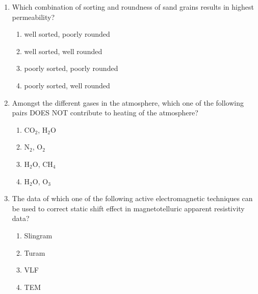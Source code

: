 \documentclass[journal,12pt,onecolumn]{IEEEtran}
\theoremstyle{remark}
\begin{document}
\begin{enumerate}
\item Which combination of sorting and roundness of sand grains results in highest permeability?  
\begin{enumerate}
\item well sorted, poorly rounded  
\item well sorted, well rounded  
\item poorly sorted, poorly rounded  
\item poorly sorted, well rounded  
\end{enumerate}

\item Amongst the different gases in the atmosphere, which one of the following pairs DOES NOT contribute to heating of the atmosphere?  
\begin{multicols}{4}
\begin{enumerate}
\item CO\(_2\), H\(_2\)O  
\item N\(_2\), O\(_2\)  
\item H\(_2\)O, CH\(_4\)  
\item H\(_2\)O, O\(_3\)  
\end{enumerate}
\end{multicols}

\item The data of which one of the following active electromagnetic techniques can be used to correct static shift effect in magnetotelluric apparent resistivity data?  
\begin{multicols}{4}
\begin{enumerate}
\item Slingram  
\item Turam  
\item VLF  
\item TEM  
\end{enumerate}
\end{multicols}

\end{enumerate}
\end{document}
